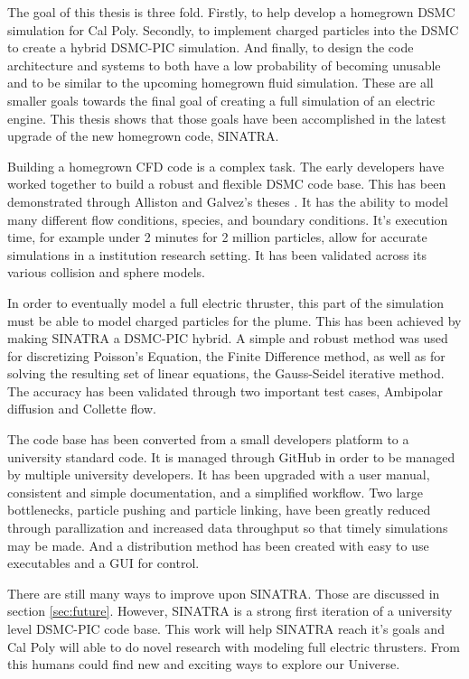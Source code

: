 
The goal of this thesis is three fold. Firstly, to help develop a homegrown DSMC simulation for Cal Poly. Secondly, to implement charged particles into the DSMC to create a hybrid DSMC-PIC simulation. And finally, to design the code architecture and systems to both have a low probability of becoming unusable and to be similar to the upcoming homegrown fluid simulation. These are all smaller goals towards the final goal of creating a full simulation of an electric engine. This thesis shows that those goals have been accomplished in the latest upgrade of the new homegrown code, SINATRA. \par

\indent Building a homegrown CFD code is a complex task. The early developers have worked together to build a robust and flexible DSMC code base. This has been demonstrated through Alliston and Galvez's theses \cite{mac_thesis} \cite{Galvez2018a}. It has the ability to model many different flow conditions, species, and boundary conditions. It's execution time, for example under 2 minutes for 2 million particles, allow for accurate simulations in a institution research setting. It has been validated across its various collision and sphere models. \par


\indent In order to eventually model a full electric thruster, this part of the simulation must be able to model charged particles for the plume. This has been achieved by making SINATRA a DSMC-PIC hybrid. A simple and robust method was used for discretizing Poisson's Equation, the Finite Difference method, as well as for solving the resulting set of linear equations, the Gauss-Seidel iterative method. The accuracy has been validated through two important test cases, Ambipolar diffusion and Collette flow. \par

\indent The code base has been converted from a small developers platform to a university standard code. It is managed through GitHub\textsuperscript{\textregistered} in order to be managed by multiple university developers. It has been upgraded with a user manual, consistent and simple documentation, and a simplified workflow. Two large bottlenecks, particle pushing and particle linking, have been greatly reduced through parallization and increased data throughput so that timely simulations may be made. And a distribution method has been created with easy to use executables and a GUI for control. \par

\indent There are still many ways to improve upon SINATRA. Those are discussed in section \ref{sec:future}. However, SINATRA is a strong first iteration of a university level DSMC-PIC code base. This work will help SINATRA reach it's goals and Cal Poly will able to do novel research with modeling full electric thrusters. From this humans could find new and exciting ways to explore our Universe.
